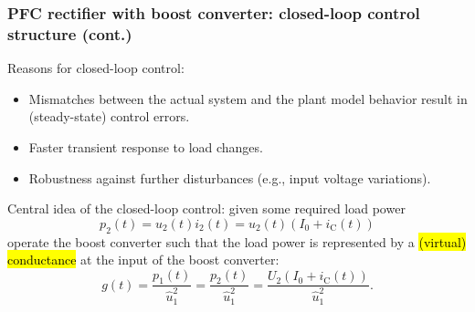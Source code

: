 \begin{frame}
    \frametitle{PFC rectifier with boost converter: closed-loop control structure (cont.)}
    Reasons for closed-loop control:
    \begin{itemize}
        \item Mismatches between the actual system and the plant model behavior result in (steady-state) control errors.
        \item Faster transient response to load changes.
        \item Robustness against further disturbances (e.g., input voltage variations).
    \end{itemize}
    Central idea of the closed-loop control: given some required load power 
    $$
    p_2(t) = u_2(t)i_2(t) = u_2(t)\left(I_0 + i_\mathrm{C}(t)\right) 
    $$
    operate the boost converter such that the load power is represented by a \hl{(virtual) conductance} at the input of the boost converter:
    $$
    g(t) = \frac{p_1(t)}{\hat{u}_1^2} = \frac{p_2(t)}{\hat{u}_1^2} = \frac{U_2\left(I_0 + i_\mathrm{C}(t)\right)}{\hat{u}_1^2}.
    $$ 
\end{frame}

